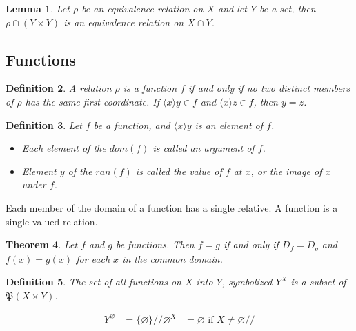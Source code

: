 \documentclass[letterpaper, 10pt]{article}
\newtheorem{thm}{Theorem}[section]
\newtheorem{lem}[thm]{Lemma}
\newtheorem{define}[thm]{Definition}
\newcommand{\set}[1]{\{#1\}}
\newcommand{\tuple}[1]{\langle #1\rangle}
\begin{document}
	\begin{lem}
		Let $\rho$ be an equivalence relation on $X$ and let $Y$ be a set, then
		$\rho \cap (Y \times Y)$ is an equivalence relation on $X \cap Y$.
	\end{lem}
	\subsection{Functions}

	\begin{define}
		A relation $\rho$ is a function $f$ if and only if no two distinct
		members of $\rho$ has the same first coordinate.
		If $\tuple{x}{y} \in f$ and $\tuple{x}{z} \in f$, then $y = z$.
	\end{define}
	\begin{define}
		Let $f$ be a function, and $\tuple{x}{y}$ is an element of $f$.
		\begin{itemize}
		\item Each element of the $dom(f)$ is called an argument of $f$.
		\item Element $y$ of the $ran(f)$ is called the value of $f$ at $x$, or
			the image of $x$ under $f$.
		\end{itemize}
	\end{define}
	Each member of the domain of a function has a single relative.
	A function is a single valued relation.

	\begin{thm}
		Let $f$ and $g$ be functions. Then $f = g$ if and only if $D_f = D_g$
		and $f(x) = g(x)$ for each $x$ in the common domain.
	\end{thm}
	\begin{define}
		The set of all functions on $X$ into $Y$, symbolized $Y^X$ is a subset
		of $\mathfrak{P}(X \times Y)$.
	\end{define}
	\begin{align*}
		Y^\varnothing &= \set{\varnothing} //
		\varnothing^X &= \varnothing \text{ if } X \neq \varnothing //
	\end{align*}
\end{document}
